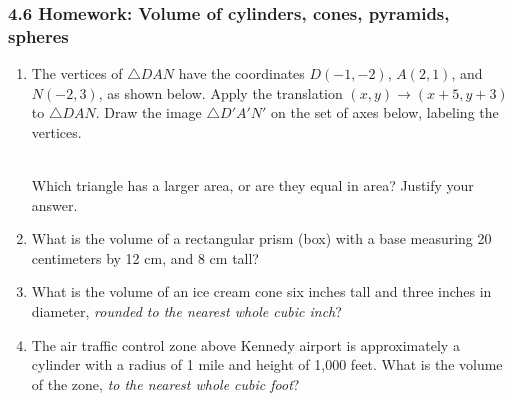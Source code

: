 

\fancyhead[LE]{\thepage}



\subsubsection*{4.6 Homework: Volume of cylinders, cones, pyramids, spheres}
\begin{enumerate}
\item The vertices of $\triangle DAN$ have the coordinates $D(-1,-2)$, $A(2,1)$, and $N(-2,3)$, as shown below. Apply the translation $(x,y) \rightarrow (x+5, y+3)$ to $\triangle DAN$. Draw the image $\triangle D'A'N'$ on the set of axes below, labeling the vertices.
\begin{multicols}{2}
  \\[0.5cm]
  Which triangle has a larger area, or are they equal in area? Justify your answer.
\end{multicols}

\item What is the volume of a rectangular prism (box) with a base measuring 20 centimeters by 12 cm, and 8 cm tall?  \vspace{2.5cm}

\item What is the volume of an ice cream cone six inches tall and three inches in diameter, \emph{rounded to the nearest whole cubic inch}?  \vspace{3cm}

\item The air traffic control zone above Kennedy airport is approximately a cylinder with a radius of 1 mile and height of 1,000 feet. What is the volume of the zone, \emph{to the nearest whole cubic foot}?


\end{enumerate}
